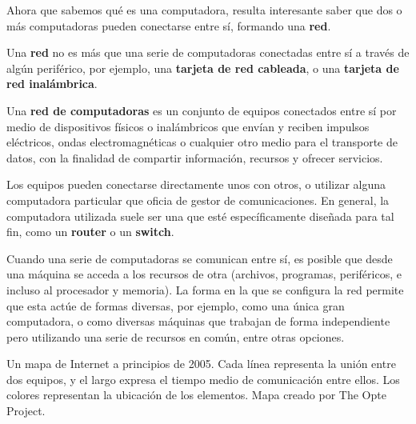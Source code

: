 Ahora que sabemos qué es una computadora, resulta interesante saber que dos o
más computadoras pueden conectarse entre sí, formando una \textbf{red}.

Una \textbf{red} no es más que una serie de computadoras conectadas entre sí
a través de algún periférico, por ejemplo, una \textbf{tarjeta de red cableada},
o una \textbf{tarjeta de red inalámbrica}.

\begin{definition}
    Una \textbf{red de computadoras} es un conjunto de equipos conectados entre sí
    por medio de dispositivos físicos o inalámbricos que envían
    y reciben impulsos eléctricos, ondas electromagnéticas o cualquier otro medio
    para el transporte de datos, con la finalidad de compartir información, recursos
    y ofrecer servicios.\autocite[vid. cap. I]{lowe_2004}
\end{definition}

Los equipos pueden conectarse directamente unos con otros, o utilizar alguna
computadora particular que oficia de gestor de comunicaciones. En general, la
computadora utilizada suele ser una que esté específicamente diseñada para tal
fin, como un \textbf{router} o un \textbf{switch}.

Cuando una serie de computadoras se comunican entre sí, es posible que desde
una máquina se acceda a los recursos de otra (archivos, programas, periféricos,
e incluso al procesador y memoria). La forma en la que se configura la red
permite que esta actúe de formas diversas, por ejemplo, como una única gran
computadora, o como diversas máquinas que trabajan de forma independiente pero
utilizando una serie de recursos en común, entre otras opciones.

{Un mapa de Internet a principios de 2005. Cada línea representa la unión entre
dos equipos, y el largo expresa el tiempo medio de comunicación entre ellos. Los
colores representan la ubicación de los elementos.}
{Mapa creado por The Opte Project.}

